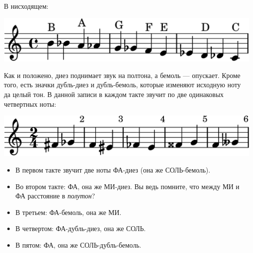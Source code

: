 В нисходящем:
\begin{center}    
    \includegraphics{fig/notes/octave-all-dn}
\end{center}

Как и положено, диез поднимает звук на полтона, а бемоль --- опускает. Кроме того, есть значки дубль-диез и дубль-бемоль, которые изменяют исходную ноту да целый тон. В данной записи в каждом такте звучит по две одинаковых четвертных ноты:
\begin{center}    
    \includegraphics{fig/notes/sharp-flat}
\end{center}

\begin{itemize}
    \item В первом такте звучит две ноты ФА-диез (она же СОЛЬ-бемоль).
    \item Во втором такте: ФА, она же МИ-диез. Вы ведь помните, что между МИ и ФА расстояние в \emph{полутон}?
    \item В третьем: ФА-бемоль, она же МИ.
    \item В четвертом: ФА-дубль-диез, она же СОЛЬ.
    \item В пятом: ФА, она же СОЛЬ-дубль-бемоль.
\end{itemize}

